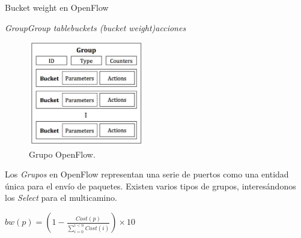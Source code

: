 \documentclass[10pt,spanish,xcolor={svgnames}]{beamer}
\begin{document}
\begin{frame}{Bucket weight en OpenFlow}
\vspace*{-0.1em}
\begin{alertblock}{\large \emph{Group}\rightarrow \emph{Group table}\rightarrow \emph{buckets (bucket weight)}\rightarrow \emph{acciones}}
\vspace*{1em}
\begin{figure}
	\centering
	\vspace{-1.5em}
	\includegraphics[width=0.45\textwidth]{figuras/gruposs.png}
	\caption{Grupo OpenFlow.}
	\label{img: grupo_openflow}
	\vspace*{-0.8em}
\end{figure}
Los \emph{Grupos} en OpenFlow representan una serie de puertos como una entidad única para el envío de paquetes. Existen varios tipos de grupos, interesándonos los \emph{Select} para el multicamino. 
\vspace*{1em}

\large$bw(p) = \left( 1 - \frac{Cost(p)}{\sum_{i=0}^{i<n} Cost(i)}\right)\times{10}$
\end{alertblock}
\end{frame}
\end{document}
